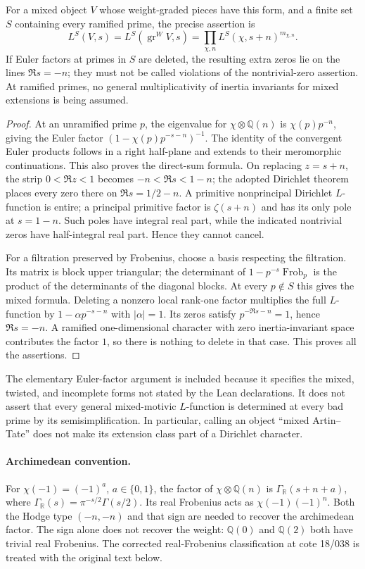 \documentclass[11pt,a4paper]{article}
\theoremstyle{definition}\newtheorem{definition}[theorem]{Definition}
\theoremstyle{remark}\newtheorem{remark}[theorem]{Remark}
\begin{document}
For a mixed object $V$ whose weight-graded pieces have this form, and a
finite set $S$ containing every ramified prime, the precise assertion is
\[
 L^S(V,s)=L^S(\operatorname{gr}^W V,s)
 =\prod_{\chi,n}L^S(\chi,s+n)^{m_{\chi,n}}.
\]
If Euler factors at primes in $S$ are deleted, the resulting extra zeros
lie on the lines $\Re s=-n$; they must not be called violations of the
nontrivial-zero assertion.  At ramified primes, no general multiplicativity
of inertia invariants for mixed extensions is being assumed.

\begin{proof}
At an unramified prime $p$, the eigenvalue for $\chi\otimes\mathbb Q(n)$
is $\chi(p)p^{-n}$, giving the Euler factor
$(1-\chi(p)p^{-s-n})^{-1}$.  The identity of the convergent Euler
products follows in a right half-plane and extends to their meromorphic
continuations.  This also proves the direct-sum formula.  On replacing
$z=s+n$, the strip $0<\Re z<1$ becomes
$-n<\Re s<1-n$; the adopted Dirichlet theorem places every zero there
on $\Re s=1/2-n$.  A primitive nonprincipal Dirichlet $L$-function is
entire; a principal primitive factor is $\zeta(s+n)$ and has its only
pole at $s=1-n$.  Such poles have integral real part, while the indicated
nontrivial zeros have half-integral real part.  Hence they cannot cancel.

For a filtration preserved by Frobenius, choose a basis respecting the
filtration.  Its matrix is block upper triangular; the determinant of
$1-p^{-s}\operatorname{Frob}_p$ is the product of the determinants of
the diagonal blocks.  At every $p\notin S$ this gives the mixed formula.
Deleting a nonzero local rank-one factor multiplies the full $L$-function
by $1-\alpha p^{-s-n}$ with $|\alpha|=1$.  Its zeros satisfy
$p^{-\Re s-n}=1$, hence $\Re s=-n$.  A ramified one-dimensional
character with zero inertia-invariant space contributes the factor $1$,
so there is nothing to delete in that case.  This proves all the assertions.
\end{proof}

The elementary Euler-factor argument is included because it specifies the
mixed, twisted, and incomplete forms not stated by the Lean declarations.
It does not assert that every general mixed-motivic $L$-function is
determined at every bad prime by its semisimplification.  In particular,
calling an object ``mixed Artin--Tate'' does not make its extension class
part of a Dirichlet character.

\paragraph{Archimedean convention.}
For $\chi(-1)=(-1)^a$, $a\in\{0,1\}$, the factor of
$\chi\otimes\mathbb Q(n)$ is $\Gamma_{\mathbb R}(s+n+a)$, where
$\Gamma_{\mathbb R}(s)=\pi^{-s/2}\Gamma(s/2)$.  Its real Frobenius
acts as $\chi(-1)(-1)^n$.  Both the Hodge type $(-n,-n)$ and that
sign are needed to recover the archimedean factor.  The sign alone does
not recover the weight: $\mathbb Q(0)$ and $\mathbb Q(2)$ both have
trivial real Frobenius.  The corrected real-Frobenius classification at
cote 18/038 is treated with the original text below.
\end{document}
